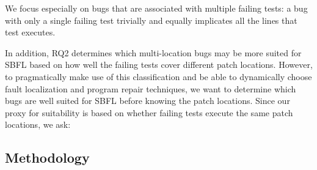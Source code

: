 \documentclass[10pt, conference]{IEEEtran}
\begin{document}





We focus especially on bugs that are associated with multiple failing tests: a bug
with only a single failing test trivially and equally implicates all the lines
that test executes. 


In addition, RQ2 determines which multi-location bugs may be more suited for SBFL 
based on how well the failing tests cover different patch locations. However, to pragmatically 
make use of this classification and be able to dynamically choose fault localization and program 
repair techniques, we want to determine which bugs are well suited for SBFL before knowing 
the patch locations. Since our proxy for suitability is based on whether failing tests execute 
the same patch locations, we ask:


\subsection{Methodology}
\end{document}
